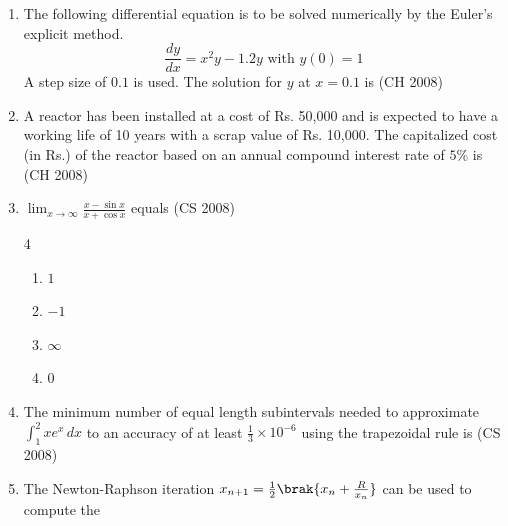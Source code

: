 \begin{enumerate}[label=\thesubsection.\arabic*,ref=\thesubsection.\theenumi]
\item The following differential equation is to be solved numerically by the Euler's explicit method.
\[\frac{dy}{dx} = x^2 y - 1.2 y \text{ with } y(0)=1\]
A step size of $0.1$ is used. The solution for $y$ at $x=0.1$ is
\hfill{(CH 2008)}
\begin{enumerate}
\end{enumerate}
\item A reactor has been installed at a cost of Rs. 50,000 and is expected to have a working life of 10 years with a scrap value of Rs. 10,000. The capitalized cost (in Rs.) of the reactor based on an annual compound interest rate of $5\%$ is
\hfill{(CH 2008)}
\begin{enumerate}
\end{enumerate}
    \item $\lim_{x \to \infty}\frac{x - \sin x}{x+ \cos x}$ equals
\hfill (CS 2008)
\begin{multicols}{4}
\begin{enumerate}
    \item $1$
    \item $-1$
    \item $\infty$
    \item $0$
\end{enumerate}
\end{multicols}
\item The minimum number of equal length subintervals needed to approximate $\int_{1}^{2} x e^x \,dx$ to an accuracy of at least $\frac{1}{3}\times 10^{-6}$ using the trapezoidal rule is
\hfill (CS 2008)
\begin{enumerate}
\end{enumerate}
\item The Newton-Raphson iteration $x_{n+1}=\frac{1}{2}\brak{x_n+\frac{R}{x_n}}$ can be used to compute the 


\end{enumerate}
